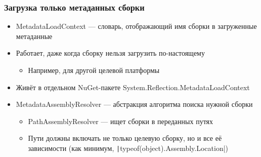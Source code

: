 \documentclass{../../slides-style}
\begin{document}
    \begin{frame}[fragile]
        \frametitle{Загрузка только метаданных сборки}
        \begin{itemize}
            \item MetadataLoadContext --- словарь, отображающий имя сборки в загруженные метаданные
            \item Работает, даже когда сборку нельзя загрузить по-настоящему
            \begin{itemize}
                \item Например, для другой целевой платформы
            \end{itemize}
            \item Живёт в отдельном NuGet-пакете System.Reflection.MetadataLoadContext
            \item MetadataAssemblyResolver --- абстракция алгоритма поиска нужной сборки
            \begin{itemize}
                \item PathAssemblyResolver --- ищет сборки в переданных путях
                \item Пути должны включать не только целевую сборку, но и все её зависимости (как минимум, \texttt|typeof(object).Assembly.Location|)
            \end{itemize}
        \end{itemize}
    \end{frame}
\end{document}
